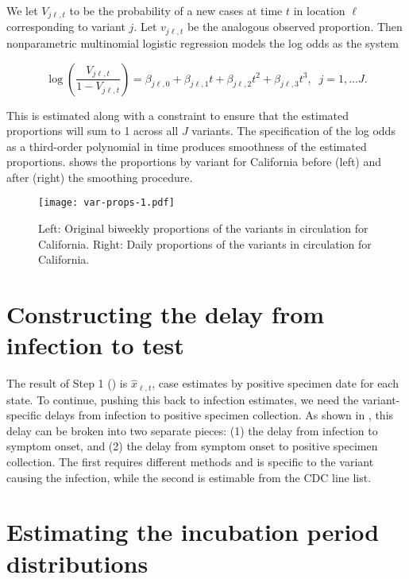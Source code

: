 We let $V_{j\ell,t}$ to be the probability of a new cases at time $t$ in location
$\ell$ corresponding to variant $j$. Let $v_{j\ell,t}$ be the analogous observed
proportion. Then nonparametric multinomial logistic regression models the log odds
as the system
\begin{linenomath*}
\begin{equation}
\log\left(\frac{V_{j\ell,t}}{1-V_{j\ell,t}}\right) = \beta_{j\ell,0} + \beta_{j\ell,1} t + \beta_{j\ell,2}t^2 + \beta_{j\ell,3}t^3,\;\; j=1,\ldots J.
\end{equation}
\end{linenomath*}
This is estimated along with a constraint to ensure that the estimated proportions will sum to 1 across all
$J$ variants. The specification of the log odds as a third-order polynomial in
time produces smoothness of the estimated proportions.
  shows the proportions by variant for California before
(left) and after (right) the smoothing procedure. 

\begin{figure}[!tb]
    \centering
        \texttt{[image: var-props-1.pdf]}
        \caption{Left: Original biweekly proportions of the variants in circulation
        for California. Right: Daily proportions of the variants in circulation for
        California.}
        \label{fig:prop_figs}
    \end{figure}


    


\section{Constructing the delay from infection to test}
\label{sec:delay-sops}

The result of Step 1 () is $\widehat{x}_{\ell,t}$, case
estimates by positive specimen date for each state. To continue, pushing this
back to infection estimates, we need the variant-specific delays from infection
to positive specimen collection. As shown in , this delay can be broken into two separate pieces: (1) the
delay from infection to symptom onset, and (2) the delay from symptom onset to
positive specimen collection. The first requires different methods and is
specific to the variant causing the infection, while the second is estimable from the CDC line
list.

\section{Estimating the incubation period distributions} 
\label{sec:incubation}

